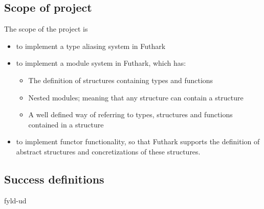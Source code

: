 \subsection{Scope of project}
\label{subsec:project_scope}
The scope of the project is
\begin{itemize}
  \item to implement a type aliasing system in Futhark
  \item to implement a module system in Futhark, which has:
    \begin{itemize}
      \item The definition of structures containing types and functions
      \item Nested modules; meaning that any structure can contain a structure
      \item A well defined way of referring to types, structures and functions
        contained in a structure
    \end{itemize}
  \item to implement functor functionality, so that Futhark supports the
    definition of abstract structures and concretizations of these structures.
\end{itemize}

\subsection{Success definitions}
\label{subsec:label}
fyld-ud
\clearpage
